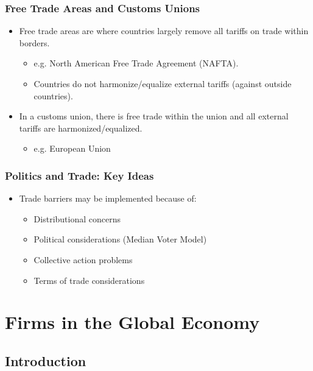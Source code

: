 \documentclass{beamer}
\begin{document}
\begin{frame}
		\frametitle{Free Trade Areas and Customs Unions}
\begin{itemize}
	\item Free trade areas are where countries largely remove all tariffs on trade within borders.\\
	\begin{itemize}
		\item e.g. North American Free Trade Agreement (NAFTA).\\
		\item Countries do not harmonize/equalize external tariffs (against outside countries).\\
	\end{itemize}
	\item In a customs union, there is free trade within the union and all external tariffs are harmonized/equalized.\\
	\begin{itemize}
		\item e.g. European Union
	\end{itemize}
\end{itemize}
\end{frame}


\begin{frame}
	\frametitle{Politics and Trade: Key Ideas}
	
	\begin{itemize}
		\item Trade barriers may be implemented because of:
		\begin{itemize}
			\item Distributional concerns
			\item Political considerations (Median Voter Model)
			\item Collective action problems
			\item Terms of trade considerations
		\end{itemize}
		
		
	\end{itemize}
	
\end{frame}

\section{Firms in the Global Economy}

\subsection{Introduction}
\end{document}
